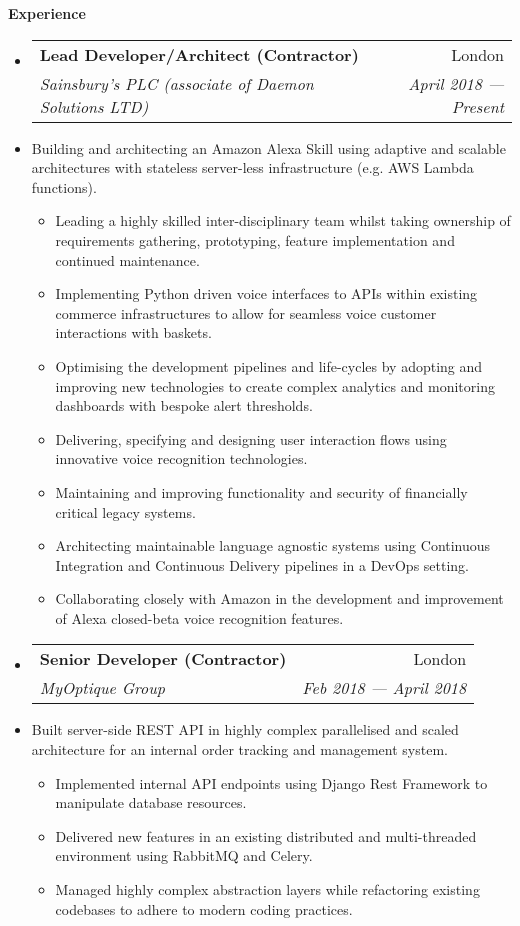 \documentclass[letterpaper,11pt]{article}
\makeatletter
\newlength{\headinglength}
\newcommand{\resheading}[1]{{\large \colorbox{mygrey}
        {\begin{minipage}{\headinglength}
            {\textbf{#1 \vphantom{p\^{E}}}}
        \end{minipage}}}}
\newcommand{\ressubheading}[4]
    {\begin{tabular*}{180mm}{l@{\extracolsep{\fill}}r}
        \textbf{#1} & #2 \\
        \textit{#3} & \textit{#4} \\
    \end{tabular*}\vspace{-6pt}}
\newcommand{\resdescription}[1]{#1 \vspace{-0mm}}
\newcommand{\resitem}[1]{\item #1 \vspace{-2pt}}
\makeatother
\begin{document}
    \resheading{Experience}
    \begin{itemize}
        \item[]
            \ressubheading{Lead Developer/Architect (Contractor)}{London}{Sainsbury's PLC (associate of Daemon Solutions LTD) }{April 2018 --- Present}
        \item[]
            \resdescription{Building and architecting an Amazon Alexa Skill using adaptive and scalable architectures with stateless server-less infrastructure (e.g. AWS Lambda functions).}
            \begin{itemize}
                    \resitem{Leading a highly skilled inter-disciplinary team whilst taking ownership of requirements gathering, prototyping, feature implementation and continued maintenance.}
                    \resitem{Implementing Python driven voice interfaces to APIs within existing commerce infrastructures to allow for seamless voice customer interactions with baskets.}
                    \resitem{Optimising the development pipelines and life-cycles by adopting and improving new technologies to create complex analytics and monitoring dashboards with bespoke alert thresholds.}
                    \resitem{Delivering, specifying and designing user interaction flows using innovative voice recognition technologies.}
                    \resitem{Maintaining and improving functionality and security of financially critical legacy systems.}
                    \resitem{Architecting maintainable language agnostic systems using Continuous Integration and Continuous Delivery pipelines in a DevOps setting.}
                    \resitem{Collaborating closely with Amazon in the development and improvement of Alexa closed-beta voice recognition features.}
            \end{itemize}

        \item[]
            \ressubheading{Senior Developer (Contractor)}{London}{MyOptique Group}{Feb 2018 --- April 2018}
        \item[]
            \resdescription{Built server-side REST API in highly complex parallelised and scaled architecture for an internal order tracking and management system.}
            \begin{itemize}
                    \resitem{Implemented internal API endpoints using Django Rest Framework to manipulate database resources.}
                    \resitem{Delivered new features in an existing distributed and multi-threaded environment using RabbitMQ and Celery.}
                    \resitem{Managed highly complex abstraction layers while refactoring existing codebases to adhere to modern coding practices.}
            \end{itemize}


\end{itemize}
\end{document}
